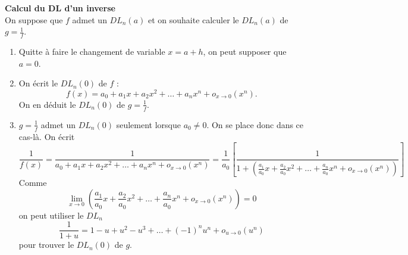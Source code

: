 
\begin{Meth}\textbf{Calcul du DL d'un inverse}\\

On suppose que \( f \) admet un \( DL_n(a) \) et on souhaite calculer le \( DL_n(a) \) de \( g = \frac{1}{f} \).\\

\begin{enumerate}
    \item Quitte à faire le changement de variable \( x = a + h \), on peut supposer que \( a = 0 \).
    \item On écrit le \( DL_n(0) \) de \( f \) :
    \[
    f(x) = a_0 + a_1 x + a_2 x^2 + \ldots + a_n x^n + o_{x \to 0} \left( x^n \right).
    \]
    On en déduit le \( DL_n(0) \) de \( g = \frac{1}{f} \).
    \item \( g = \frac{1}{f} \) admet un \( DL_n(0) \) seulement lorsque \( a_0 \neq 0 \). On se place donc dans ce cas-là. On écrit
    \[
    \frac{1}{f(x)} = \frac{1}{a_0 + a_1 x + a_2 x^2 + \ldots + a_n x^n + o_{x \to 0} \left( x^n \right)} = \frac{1}{a_0} \left[ \frac{1}{1 + \left( \frac{a_1}{a_0} x + \frac{a_2}{a_0} x^2 + \ldots + \frac{a_n}{a_0} x^n + o_{x \to 0} \left( x^n \right) \right)} \right]
    \]
    Comme
    \[
    \lim_{x \to 0} \left( \frac{a_1}{a_0} x + \frac{a_2}{a_0} x^2 + \ldots + \frac{a_n}{a_0} x^n + o_{x \to 0} \left( x^n \right) \right) = 0
    \]
    on peut utiliser le \( DL_n \)
    \[
    \frac{1}{1 + u} = 1 - u + u^2 - u^3 + \ldots + (-1)^n u^n + o_{u \to 0} \left( u^n \right)
    \]
    pour trouver le \( DL_n(0) \) de \( g \).\\
\end{enumerate}
\end{Meth}


